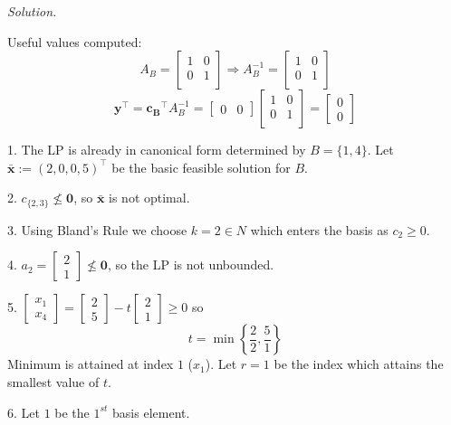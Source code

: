 \emph{Solution.}


Useful values computed:
\[ A_B=
\begin{bmatrix}
    1 & 0\\
    0 & 1\\
\end{bmatrix} \Rightarrow
A_B^{-1}=
\begin{bmatrix}
    1 & 0\\
    0 & 1\\
\end{bmatrix} \]
\[ \bm{y}^\top=\bm{c_B}^\top A_B^{-1}=
\begin{bmatrix}
    0 & 0
\end{bmatrix}
\begin{bmatrix}
    1 & 0\\
    0 & 1\\
\end{bmatrix}=
\begin{bmatrix}
    0 \\
    0
\end{bmatrix}\]

1. The LP is already in canonical form determined by $ B=\{1,4\} $.
Let $ \bm{\bar{x}}:=(2,0,0,5)^\top $ be the basic feasible solution for $ B $.

2. $ c_{\{2,3\}} \nleq \bm{0} $, so $ \bm{\bar{x}} $ is not optimal.

3. Using Bland's Rule we choose $ k=2\in N $ which enters the basis
as $ c_2\ge 0 $.

4.
$ 
a_2= \begin{bmatrix}
    2\\
    1
\end{bmatrix}\nleq \bm{0}
$, so the LP is not unbounded.

5.
$
\begin{bmatrix}
    x_1\\
    x_4
\end{bmatrix}
=
\begin{bmatrix}
    2\\
    5
\end{bmatrix}-t
\begin{bmatrix}
    2\\
    1
\end{bmatrix}\ge 0
$
so
\[ t=\min \left\{\frac{2}{2},\frac{5}{1} \right\} \]
Minimum is attained at index $ 1 $ ($ x_1 $). Let $ r=1 $ be the index which attains the smallest value of $ t $.

6. Let $ 1 $ be the $ 1^{st} $ basis element.

